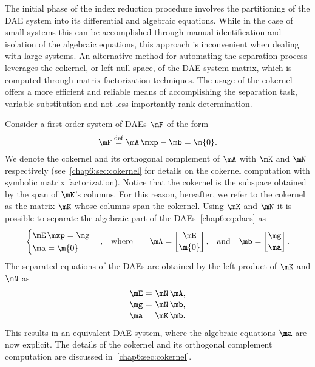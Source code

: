 The initial phase of the index reduction procedure involves the partitioning of the \ac{DAE} system into its differential and algebraic equations. While in the case of small systems this can be accomplished through manual identification and isolation of the algebraic equations, this approach is inconvenient when dealing with large systems. An alternative method for automating the separation process leverages the cokernel, or left null space, of the \ac{DAE} system matrix, which is computed through matrix factorization techniques. The usage of the cokernel offers a more efficient and reliable means of accomplishing the separation task, variable substitution and not less importantly rank determination.

Consider a first-order system of \acp{DAE} $\mF$ of the form
%
\begin{equation}
  \label{chap6:eq:daes}
  \mF \overset{\mathrm{def}}{=}\mA \, \mxp - \mb = \m{0}.
\end{equation}
%
We denote the cokernel and its orthogonal complement of $\mA$ with $\mK$ and $\mN$ respectively (see~\ref{chap6:sec:cokernel} for details on the cokernel computation with symbolic matrix factorization). Notice that the cokernel is the subspace obtained by the span of $\mK$'s columns. For this reason, hereafter, we refer to the cokernel as the matrix $\mK$ whose columns span the cokernel. Using $\mK$ and $\mN$ it is possible to separate the algebraic part of the \acp{DAE}~\eqref{chap6:eq:daes} as
%
\begin{equation}
  \label{chap6:eq:separated_daes}
  \begin{cases}
    \mE \, \mxp = \mg \\[0.1em]
    \ma = \m{0}
  \end{cases} \text{,} \quad \text{where} \qquad \mA = \begin{bmatrix}
    \mE \\[0.2em]
    \m{0}
  \end{bmatrix} \text{,}
  \quad \text{and} \quad
  \mb = \begin{bmatrix} \mg \\[0.2em] \ma \end{bmatrix} \text{.}
\end{equation}
%
The separated equations of the \acp{DAE} are obtained by the left product of $\mK$ and $\mN$ as
%
\begin{equation}
  \begin{array}{l@{~}c@{~}l}
    \mE &=& \mN \, \mA \text{,} \\[0.1em]
    \mg &=& \mN \, \mb \text{,} \\[0.1em]
    \ma &=& \mK \, \mb \text{.}
  \end{array}
\end{equation}
%
This results in an equivalent \ac{DAE} system, where the algebraic equations $\ma$ are now explicit. The details of the cokernel and its orthogonal complement computation are discussed in~\ref{chap6:sec:cokernel}.

